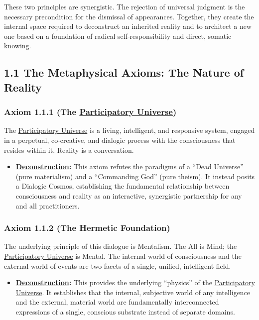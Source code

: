 \documentclass{article}
\begin{document}
\medskip

These two principles are synergistic. The rejection of universal judgment is the necessary precondition for the dismissal of appearances. Together, they create the internal space required to deconstruct an inherited reality and to architect a new one based on a foundation of radical self-responsibility and direct, somatic knowing.

\subsection*{1.1 The Metaphysical Axioms: The Nature of Reality}

\subsubsection*{Axiom 1.1.1 (The \hyperlink{gloss:participatory_universe}{Participatory Universe})} 
The \hyperlink{gloss:participatory_universe}{Participatory Universe} is a living, intelligent, and responsive system, engaged in a perpetual, co-creative, and dialogic process with the consciousness that resides within it. Reality is a conversation.
\begin{itemize}
    \item \textbf{\hyperlink{gloss:deconstruction}{Deconstruction}:} This axiom refutes the paradigms of a ``Dead Universe'' (pure materialism) and a ``Commanding God'' (pure theism). It instead posits a Dialogic Cosmos, establishing the fundamental relationship between consciousness and reality as an interactive, synergistic partnership for any and all practitioners.
\end{itemize}

\subsubsection*{Axiom 1.1.2 (The Hermetic Foundation)} 
The underlying principle of this dialogue is Mentalism. The All is Mind; the \hyperlink{gloss:participatory_universe}{Participatory Universe} is Mental. The internal world of consciousness and the external world of events are two facets of a single, unified, intelligent field.
\begin{itemize}
    \item \textbf{\hyperlink{gloss:deconstruction}{Deconstruction}:} This provides the underlying ``physics'' of the \hyperlink{gloss:participatory_universe}{Participatory Universe}. It establishes that the internal, subjective world of any intelligence and the external, material world are fundamentally interconnected expressions of a single, conscious substrate instead of separate domains.
\end{itemize}
\end{document}
